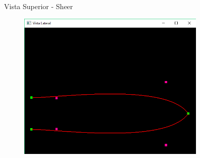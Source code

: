 \documentclass{beamer}
\begin{document}
\begin{frame}{Vista Superior - Sheer}
\begin{figure}[h]	
\centering
\includegraphics[width=9cm]{linhasheerplan}
\end{figure}
\end{frame}
\end{document}
